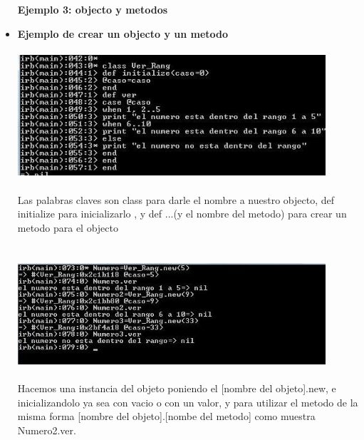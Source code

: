 \documentclass[11pt]{article} %
\begin{document}
\begin{itemize}
 {\fontsize{14}{0} \bf Ejemplo 3: objecto y metodos\\}
  \item {\bf Ejemplo de crear un objecto y un metodo}\\\\
	    \includegraphics[width=0.9\textwidth]{./imagenes/objeto}\\\\
Las palabras claves son class para darle el nombre a nuestro objecto,  def  initialize  para inicializarlo , y def ...(y el nombre del metodo) para crear un metodo para el objecto\\
  	   \\\\
	    \includegraphics[width=0.9\textwidth]{./imagenes/ejemplo_de_clase}\\\\
Hacemos una instancia del objeto poniendo el [nombre del objeto].new, e inicializandolo ya sea con vacio o con un valor, y para utilizar el metodo de la misma forma [nombre del objeto].[nombe del metodo] como muestra Numero2.ver.\\


\end{itemize}
\end{document}
